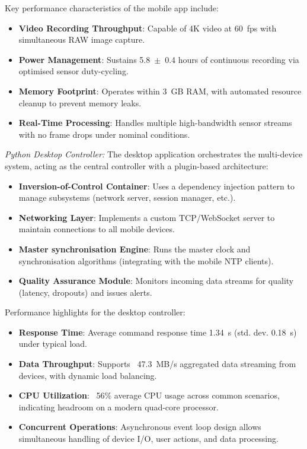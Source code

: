 \documentclass[11pt,a4paper]{report}
\begin{document}
{Key performance characteristics of the mobile app include:

\begin{itemize}
    \item \textbf{Video Recording Throughput}: Capable of 4K video at 60~fps with simultaneous RAW image capture.
    \item \textbf{Power Management}: Sustains 5.8~$\pm$~0.4 hours of continuous recording via optimised sensor duty-cycling.
    \item \textbf{Memory Footprint}: Operates within 3~GB RAM, with automated resource cleanup to prevent memory leaks.
    \item \textbf{Real-Time Processing}: Handles multiple high-bandwidth sensor streams with no frame drops under nominal conditions.
\end{itemize}

\emph{Python Desktop Controller:} The desktop application orchestrates the multi-device system, acting as the central controller with a plugin-based architecture:

\begin{itemize}
    \item \textbf{Inversion-of-Control Container}: Uses a dependency injection pattern to manage subsystems (network server, session manager, etc.).
    \item \textbf{Networking Layer}: Implements a custom TCP/WebSocket server to maintain connections to all mobile devices.
    \item \textbf{Master synchronisation Engine}: Runs the master clock and synchronisation algorithms (integrating with the mobile NTP clients).
    \item \textbf{Quality Assurance Module}: Monitors incoming data streams for quality (latency, dropouts) and issues alerts.
\end{itemize}

Performance highlights for the desktop controller:

\begin{itemize}
    \item \textbf{Response Time}: Average command response time 1.34~s (std. dev. 0.18~s) under typical load.
    \item \textbf{Data Throughput}: Supports ~47.3~MB/s aggregated data streaming from devices, with dynamic load balancing.
    \item \textbf{CPU Utilization}: ~56\% average CPU usage across common scenarios, indicating headroom on a modern quad-core processor.
    \item \textbf{Concurrent Operations}: Asynchronous event loop design allows simultaneous handling of device I/O, user actions, and data processing.
\end{itemize}

}
\end{document}
